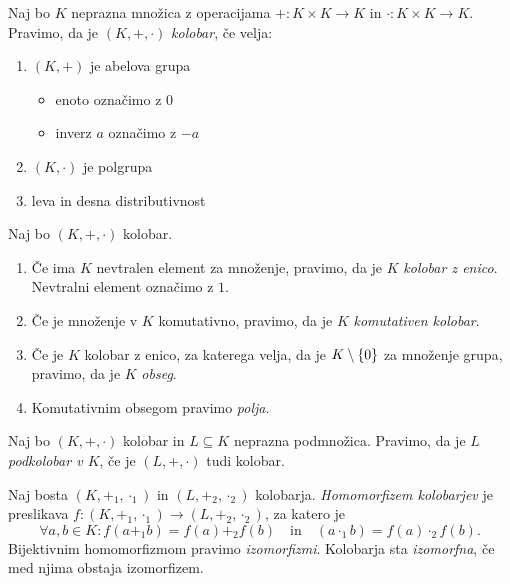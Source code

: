 \documentclass[12pt, a4paper]{article}
\begin{document}
\begin{okvir}
\begin{definicija}
Naj bo $K$ neprazna množica z operacijama $+\colon K\times K\to K$ in $\cdot\colon K\times K\to K$. Pravimo, da je $(K,+,\cdot)$ \emph{kolobar}, če velja:

\begin{enumerate}[label=\alph*)]
\item $(K,+)$ je abelova grupa
\begin{itemize}
\item enoto označimo z $0$
\item inverz $a$ označimo z $-a$
\end{itemize}
\item $(K,\cdot)$ je polgrupa
\item leva in desna distributivnost
\end{enumerate}
\end{definicija}

\begin{definicija}
Naj bo $(K,+,\cdot)$ kolobar.

\begin{enumerate}[label=\alph*)]
\item Če ima $K$ nevtralen element za množenje, pravimo, da je $K$ \emph{kolobar z enico}. Nevtralni element označimo z $1$.
\item Če je množenje v $K$ komutativno, pravimo, da je $K$ \emph{komutativen kolobar}.
\item Če je $K$ kolobar z enico, za katerega velja, da je $K\setminus\left\{0\right\}$ za množenje grupa, pravimo, da je $K$ \emph{obseg}.
\item Komutativnim obsegom pravimo \emph{polja}.
\end{enumerate}
\end{definicija}
\end{okvir}

\begin{definicija}
Naj bo $(K,+,\cdot)$ kolobar in $L\subseteq K$ neprazna podmnožica. Pravimo, da je $L$ \emph{podkolobar v $K$}, če je $(L,+,\cdot)$ tudi kolobar.
\end{definicija}

\begin{definicija}
Naj bosta $(K,+_1,\cdot_1)$ in $(L,+_2,\cdot_2)$ kolobarja. \emph{Homomorfizem kolobarjev} je preslikava $f\colon (K,+_1,\cdot_1)\to(L,+_2,\cdot_2)$, za katero je
\[\forall a,b\in K\colon f(a +_1 b)=f(a) +_2 f(b)\quad\text{in}\quad (a \cdot_1 b)=f(a) \cdot_2 f(b).\]
Bijektivnim homomorfizmom pravimo \emph{izomorfizmi}. Kolobarja sta \emph{izomorfna}, če med njima obstaja izomorfizem.
\end{definicija}
\end{document}
